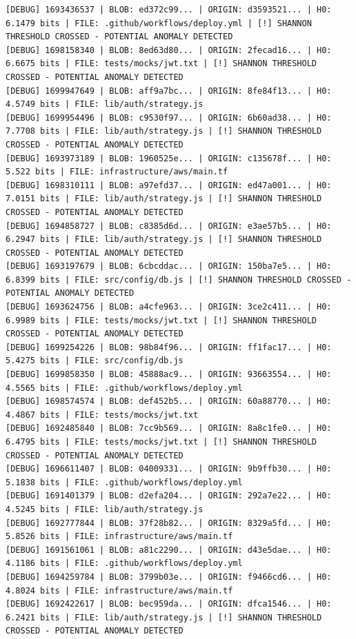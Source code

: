 \documentclass[12pt, a4paper, oneside]{report}
\begin{document}
\begin{lstlisting}[basicstyle=\tiny\ttfamily]
[DEBUG] 1693436537 | BLOB: ed372c99... | ORIGIN: d3593521... | H0: 6.1479 bits | FILE: .github/workflows/deploy.yml | [!] SHANNON THRESHOLD CROSSED - POTENTIAL ANOMALY DETECTED
[DEBUG] 1698158340 | BLOB: 8ed63d80... | ORIGIN: 2fecad16... | H0: 6.6675 bits | FILE: tests/mocks/jwt.txt | [!] SHANNON THRESHOLD CROSSED - POTENTIAL ANOMALY DETECTED
[DEBUG] 1699947649 | BLOB: aff9a7bc... | ORIGIN: 8fe84f13... | H0: 4.5749 bits | FILE: lib/auth/strategy.js
[DEBUG] 1699954496 | BLOB: c9530f97... | ORIGIN: 6b60ad38... | H0: 7.7708 bits | FILE: lib/auth/strategy.js | [!] SHANNON THRESHOLD CROSSED - POTENTIAL ANOMALY DETECTED
[DEBUG] 1693973189 | BLOB: 1960525e... | ORIGIN: c135678f... | H0: 5.522 bits | FILE: infrastructure/aws/main.tf
[DEBUG] 1698310111 | BLOB: a97efd37... | ORIGIN: ed47a001... | H0: 7.0151 bits | FILE: lib/auth/strategy.js | [!] SHANNON THRESHOLD CROSSED - POTENTIAL ANOMALY DETECTED
[DEBUG] 1694858727 | BLOB: c8385d6d... | ORIGIN: e3ae57b5... | H0: 6.2947 bits | FILE: lib/auth/strategy.js | [!] SHANNON THRESHOLD CROSSED - POTENTIAL ANOMALY DETECTED
[DEBUG] 1693197679 | BLOB: 6cbcddac... | ORIGIN: 150ba7e5... | H0: 6.8399 bits | FILE: src/config/db.js | [!] SHANNON THRESHOLD CROSSED - POTENTIAL ANOMALY DETECTED
[DEBUG] 1693624756 | BLOB: a4cfe963... | ORIGIN: 3ce2c411... | H0: 6.9989 bits | FILE: tests/mocks/jwt.txt | [!] SHANNON THRESHOLD CROSSED - POTENTIAL ANOMALY DETECTED
[DEBUG] 1699254226 | BLOB: 98b84f96... | ORIGIN: ff1fac17... | H0: 5.4275 bits | FILE: src/config/db.js
[DEBUG] 1699858350 | BLOB: 45888ac9... | ORIGIN: 93663554... | H0: 4.5565 bits | FILE: .github/workflows/deploy.yml
[DEBUG] 1698574574 | BLOB: def452b5... | ORIGIN: 60a88770... | H0: 4.4867 bits | FILE: tests/mocks/jwt.txt
[DEBUG] 1692485840 | BLOB: 7cc9b569... | ORIGIN: 8a8c1fe0... | H0: 6.4795 bits | FILE: tests/mocks/jwt.txt | [!] SHANNON THRESHOLD CROSSED - POTENTIAL ANOMALY DETECTED
[DEBUG] 1696611407 | BLOB: 04009331... | ORIGIN: 9b9ffb30... | H0: 5.1838 bits | FILE: .github/workflows/deploy.yml
[DEBUG] 1691401379 | BLOB: d2efa204... | ORIGIN: 292a7e22... | H0: 4.5245 bits | FILE: lib/auth/strategy.js
[DEBUG] 1692777844 | BLOB: 37f28b82... | ORIGIN: 8329a5fd... | H0: 5.8526 bits | FILE: infrastructure/aws/main.tf
[DEBUG] 1691561061 | BLOB: a81c2290... | ORIGIN: d43e5dae... | H0: 4.1186 bits | FILE: .github/workflows/deploy.yml
[DEBUG] 1694259784 | BLOB: 3799b03e... | ORIGIN: f9466cd6... | H0: 4.8024 bits | FILE: infrastructure/aws/main.tf
[DEBUG] 1692422617 | BLOB: bec959da... | ORIGIN: dfca1546... | H0: 6.2421 bits | FILE: lib/auth/strategy.js | [!] SHANNON THRESHOLD CROSSED - POTENTIAL ANOMALY DETECTED

\end{lstlisting}
\end{document}
